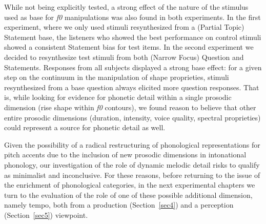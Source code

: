 While not being explicitly tested, a strong effect of the nature of the stimulus used as base for \textit{f0} manipulations was also found in both experiments. In the first experiment, where we only used stimuli resynthesized from a (Partial Topic) Statement base, the listeners who showed the best performance on control stimuli showed a consistent Statement bias for test items. In the second experiment we decided to resynthesize test stimuli from both (Narrow Focus) Question and Statements. Responses from all subjects displayed a strong base effect: for a given step on the continuum in the manipulation of shape proprieties, stimuli resynthesized from a base question always elicited more question responses. That is, while looking for evidence for phonetic detail within a single prosodic dimension (rise shape within \textit{f0} contours), we found reason to believe that other entire prosodic dimensions (duration, intensity, voice quality, spectral proprieties) could represent a source for phonetic detail as well.

Given the possibility of a radical restructuring of phonological representations for pitch accents due to the inclusion of new prosodic dimensions in intonational phonology, our investigation of the role of dynamic melodic detail risks to qualify as minimalist and inconclusive. For these reasons, before returning to the issue of the enrichment of phonological categories, in the next experimental chapters we turn to the evaluation of the role of one of these possible additional dimension, namely tempo, both from a production (Section~\ref{sec4}) and a perception (Section~\ref{sec5}) viewpoint.